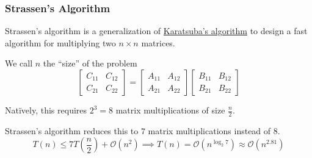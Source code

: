 \subsubsection{Strassen's Algorithm}

Strassen's algorithm is a generalization of \hyperref[subsubsec:karatsuba]{Karatsuba's algorithm} to design a fast algorithm for multiplying two $n \times n$ matrices.

\begin{listu}
    \item We call $n$ the ``size'' of the problem \[
        \begin{bmatrix}
            C_{11} & C_{12} \\
            C_{21} & C_{22}
        \end{bmatrix} = \begin{bmatrix}
            A_{11} & A_{12} \\
            A_{21} & A_{22}
        \end{bmatrix} \begin{bmatrix}
            B_{11} & B_{12} \\
            B_{21} & B_{22}
        \end{bmatrix}
    \]

    \item Nat\"ively, this requires $2^3 = 8$ matrix multiplications of size $\frac{n}{2}$. 
    
    \item Strassen's algorithm reduces this to $7$ matrix multiplications instead of $8$. \[
        T(n) \le 7T\left( \frac{n}{2} \right) + \mathcal{O}(n^2) \implies T(n) = \mathcal{O}(n^{\log_2 7}) \approx \mathcal{O}(n^{2.81})
    \]
\end{listu}
\vspace{-2em}
